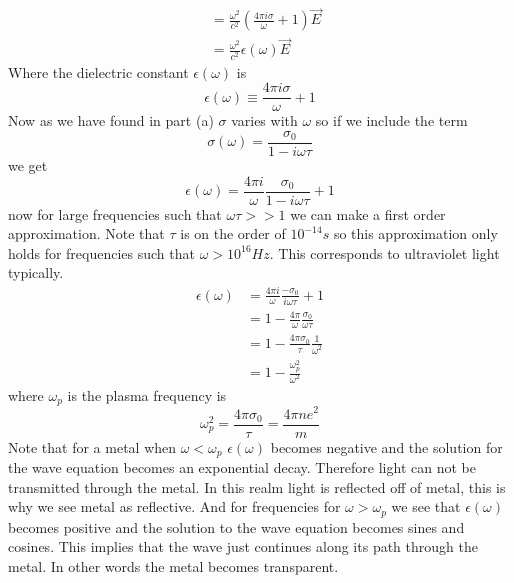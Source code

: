 \documentclass[11pt]{article}
\numberwithin{equation}{section}
\begin{document}
\begin{enumerate}[(a)]
\begin{align*}
&= \frac{\omega^2}{c^2}\left(\frac{4\pi i\sigma}{\omega}+ 1\right)\vec{E}\\
&= \frac{\omega^2}{c^2}\epsilon(\omega)\vec{E} 
\end{align*}
Where the dielectric constant $\epsilon(\omega)$ is 
$$\epsilon(\omega) \equiv \frac{4\pi i\sigma}{\omega}+ 1$$
Now as we have found in part (a) $\sigma$ varies with $\omega$ so if we include the term
$$\sigma(\omega) = \frac{\sigma_0}{1-i\omega\tau}$$
we get
$$\epsilon(\omega) = \frac{4\pi i}{\omega}\frac{\sigma_0}{1-i\omega\tau}+ 1$$
now for large frequencies such that $\omega\tau >> 1$ we can make a first order approximation. Note that $\tau$ is on the order of $10^{-14}\unit{s}$ so this approximation only holds for frequencies such that $\omega>10^{16}\unit{Hz}$. This corresponds to ultraviolet light typically.
\begin{align*}
\epsilon(\omega) &= \frac{4\pi i}{\omega}\frac{-\sigma_0}{i\omega\tau}+ 1\\
&= 1 - \frac{4\pi}{\omega}\frac{\sigma_0}{\omega\tau}\\
&= 1 - \frac{4\pi\sigma_0}{\tau}\frac{1}{\omega^2}\\
&= 1 - \frac{\omega_p^2}{\omega^2}
\end{align*}
where $\omega_p$ is the plasma frequency is 
$$\omega_p^2 = \frac{4\pi\sigma_0}{\tau} = \frac{4\pi ne^2}{m}$$
Note that for a metal when $\omega<\omega_p$ $\epsilon(\omega)$ becomes negative and the solution for the wave equation becomes an exponential decay. Therefore light can not be transmitted through the metal. In this realm light is reflected off of metal, this is why we see metal as reflective. And for frequencies for $\omega>\omega_p$ we see that $\epsilon(\omega)$ becomes positive and the solution to the wave equation becomes sines and cosines. This implies that the wave just continues along its path through the metal. In other words the metal becomes transparent.
\end{enumerate}
\end{document}
